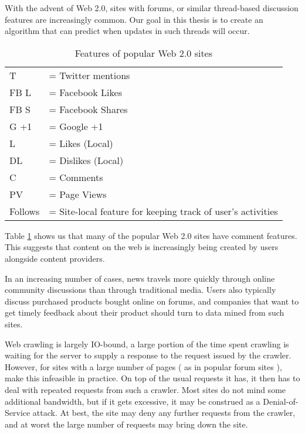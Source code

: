 With the advent of Web 2.0, sites with forums, or similar thread-based
discussion features are increasingly common.  Our goal in this thesis
is to create an algorithm that can predict when updates in such
threads will occur.
\begin{table}\label{table:web20}
	{\footnotesize
\caption{Features of popular Web 2.0 sites}
	\begin{tabular}{l l}
		T &= Twitter mentions\\
	 FB L &= Facebook Likes \\
		FB S &= Facebook Shares\\
	G +1 &= Google +1\\
		   L&= Likes (Local) \\
   		DL &= Dislikes (Local) \\
			C &= Comments \\
		PV &= Page Views \\
   Follows &= Site-local feature for keeping track of user's activities
	\end{tabular}
}
\end{table}

Table \ref{table:web20} shows us that many of the popular Web 2.0
sites have comment features. This suggests that content on the web is
increasingly being created by users alongside content providers.

In an increasing number of cases, news travels more quickly through
online community discussions than through traditional media. Users also
typically discuss purchased products bought online on forums,
and companies that want to get timely feedback about their product
should turn to data mined from such sites.

Web crawling is largely IO-bound, a large portion of the time spent crawling is 
waiting for the server to supply a response to the request issued by the 
crawler. However, for sites with a large number of pages ( as in popular forum 
sites ), make this infeasible in practice. On top of the usual requests it has, 
it then has to deal with repeated requests from such a crawler. Most sites do 
not mind some additional bandwidth, but if it gets excessive, it may be 
construed as a Denial-of-Service attack. At best, the site may deny any further 
requests from the crawler, and at worst the large number of requests may bring 
down the site.

